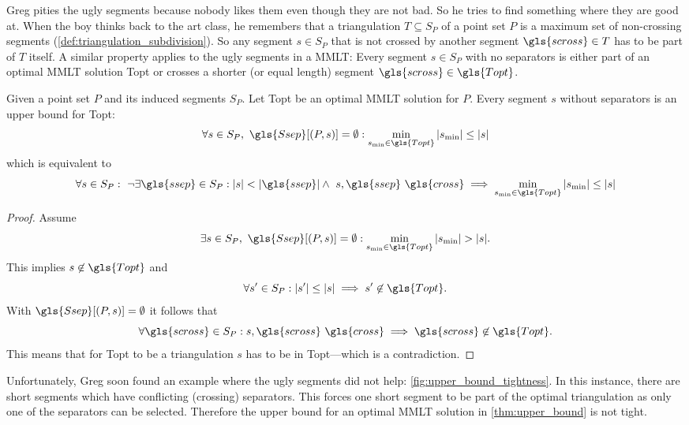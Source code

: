 Greg pities the ugly segments because nobody likes them even though
they are not bad. So he tries to find something where they are good
at. When the boy thinks back to the art class, he remembers that a 
triangulation \(T\subseteq S_P\) of a point set \(P\) is a maximum
set of non-crossing segments (\cref{def:triangulation_subdivision}).
So any segment \(s \in S_P\) that is
not crossed by another segment \(\gls{scross} \in T\) has to be part
of \(T\) itself. A similar property applies to the ugly segments
in a \gls{MMLT}: Every segment \(s \in S_P\) with no separators
is either part of an optimal \gls{MMLT} solution \gls{Topt} or
crosses a shorter (or equal length) segment
\(\gls{scross} \in \gls{Topt}\).

\begin{theorem}\label{thm:upper_bound}
  Given a point set \(P\) and its induced segments \(S_P\). Let
  \gls{Topt} be an optimal \gls{MMLT} solution for \(P\). Every
  segment \(s\) without separators is an upper bound for \gls{Topt}:
  \[
    \forall s \in S_P,~ \gls{Ssep}[(P,s)] = \emptyset :
    \min\limits_{s_{\min} \in \gls{Topt}} |s_{\min}| \leq |s|
  \]
  which is equivalent to
  \[
    \forall s \in S_P:~ \lnot\exists \gls{ssep} \in S_P :
    |s| < |\gls{ssep}| \land~ s, \gls{ssep}~ \gls{cross}
    \implies \min\limits_{s_{\min} \in \gls{Topt}} |s_{\min}| \leq |s|
  \]
\end{theorem}

\begin{proof}
  Assume
  \[
    \exists s \in S_P,~ \gls{Ssep}[(P,s)] = \emptyset :
    \min\limits_{s_{\min} \in \gls{Topt}} |s_{\min}| > |s|.
  \]
  This implies \(s \not\in \gls{Topt}\) and
  \[
    \forall s' \in S_P :
    |s'| \leq |s| \implies s' \not\in \gls{Topt}.
  \]
  With \(\gls{Ssep}[(P,s)] = \emptyset\) it follows that
  \[
    \forall \gls{scross} \in S_P :
    s, \gls{scross}~\gls{cross}
    \implies \gls{scross} \not\in \gls{Topt}.
  \]
  This means that for \gls{Topt} to be a triangulation \(s\) has 
  to be in \gls{Topt}---which is a contradiction.
\end{proof}

Unfortunately, Greg soon found an example where the ugly segments did
not help: \cref{fig:upper_bound_tightness}. In this instance, there
are short segments which have conflicting (crossing) separators. This
forces one short segment to be part of the optimal triangulation as
only one of the separators can be selected. Therefore the upper bound
for an optimal \gls{MMLT} solution in \cref{thm:upper_bound} is not
tight.

